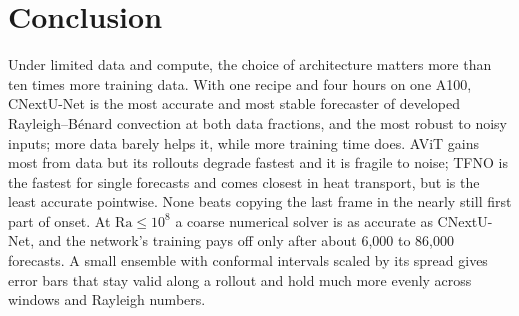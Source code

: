 \documentclass[11pt]{article}
\begin{document}
\section{Conclusion}
\label{sec:conclusion}

Under limited data and compute, the choice of architecture matters more than ten times more training data. With one
recipe and four hours on one A100, CNextU-Net is the most accurate and most stable forecaster of developed
Rayleigh--B\'enard convection at both data fractions, and the most robust to noisy inputs; more data barely helps it,
while more training time does. AViT gains most from data but its rollouts degrade fastest and it is fragile to noise;
TFNO is the fastest for single forecasts and comes closest in heat transport, but is the least accurate pointwise.
None beats copying the last frame in the nearly still first part of onset. At $\mathrm{Ra}\le10^8$ a coarse numerical
solver is as accurate as CNextU-Net, and the network's training pays off only after about 6,000 to 86,000
forecasts. A small ensemble with conformal intervals scaled by its spread gives error bars that stay valid along a
rollout and hold much more evenly across windows and Rayleigh numbers.

\clearpage
\end{document}
